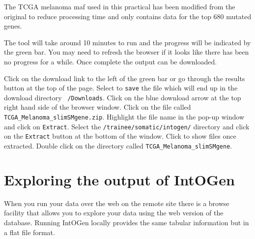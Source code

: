 \begin{note}
The TCGA melanoma maf used in this practical has been modified from the original
to reduce processing time and only contains data for the top 680 mutated genes.
\end{note}

\begin{information}
The tool will take around 10 minutes to run and the progress will be indicated
by the green bar. You may need to refresh the browser if it looks like there
has been no progress for a while.
\vspace{4 mm}
Once complete the output can be downloaded.
\end{information}

\begin{steps}
Click on the download link to the left of the green bar or go through the
results button at the top of the page.
\vspace{4 mm}
Select to \texttt{save} the file which will end up in the download
directory \texttt{~/Downloads}.
\vspace{4 mm}
Click on the blue download arrow at the top right hand side of the browser window.
\vspace{4 mm}
Click on the file called \texttt{TCGA\_Melanoma\_slimSMgene.zip}.
\vspace{4 mm}
Highlight the file name in the pop-up window and click on \texttt{Extract}.
\vspace{4 mm}
Select the \texttt{/trainee/somatic/intogen/} directory and click on the
\texttt{Extract} button at the bottom of the window.
\vspace{4 mm}
Click to show files once extracted.
\vspace{4 mm}
Double click on the directory called \texttt{TCGA\_Melanoma\_slimSMgene}.
\end{steps}

\section{Exploring the output of IntOGen}

\begin{information}
When you run your data over the web on the remote site there is a browse facility that
allows you to explore your data using the web version of the database. Running IntOGen locally
provides the same tabular information but in a flat file format.
\end{information}

